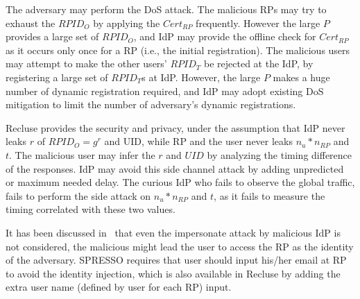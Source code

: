  The adversary may perform the DoS attack. The malicious RPs may try to exhaust the $RPID_O$  by applying the $Cert_{RP}$ frequently. However the large $P$ provides a large set of $RPID_O$, and IdP may provide the offline check for $Cert_{RP}$ as it occurs only once for a RP (i.e., the initial registration). The malicious users may attempt to make the other users' $RPID_T$ be rejected at the IdP, by registering a large set of $RPID_T$s at IdP. However, the large $P$ makes a huge number of dynamic registration required, and IdP may adopt existing DoS mitigation  to limit the number of adversary's dynamic registrations. 

 Recluse provides the security and privacy, under the assumption that IdP never leaks $r$ of $RPID_O=g^r$ and UID, while RP and the user never leaks $n_u*n_{RP}$ and $t$. The malicious user may infer the $r$ and $UID$ by analyzing the timing difference of the responses. IdP may avoid this side channel attack by adding unpredicted or maximum needed delay. The curious IdP who fails to observe the global traffic, fails to perform the side attack on $n_u*n_{RP}$ and $t$, as it fails to measure the timing correlated with these two values.

 It has been discussed in~\cite{SPRESSO} that even the impersonate attack by malicious IdP is not considered, the malicious might lead the user to access the RP as the identity of the adversary. SPRESSO requires that user should input his/her email at RP to avoid the identity injection, which is also available in Recluse by adding the extra user name (defined by user for each RP) input. 
